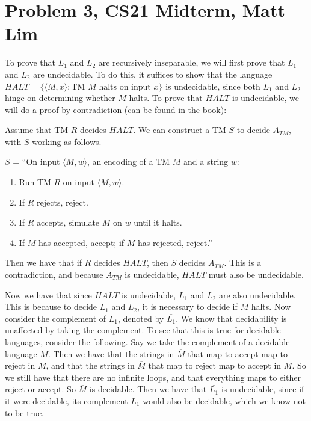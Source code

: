 \documentclass{article}
\begin{document}
\section*{Problem 3, CS21 Midterm, Matt Lim}
To prove that $L_{1}$ and $L_{2}$ are recursively inseparable, we will first
prove that $L_{1}$ and $L_{2}$ are undecidable. To do this, it suffices
to show that the language $HALT = \{\langle M,x \rangle : \text{TM }
M \text{ halts on input } x\}$ is undecidable, since both $L_{1}$ and
$L_{2}$ hinge on determining whether $M$ halts. To prove that $HALT$ is
undecidable, we will do a proof by contradiction (can be found in the
book):

Assume that TM $R$ decides $HALT$. We can construct a TM $S$ to decide
$A_{TM}$, with $S$ working as follows.

\noindent $S$ = ``On input $\langle M,w \rangle$, an encoding of a TM $M$ and
a string
$w$:
    \begin{enumerate}
        \item Run TM $R$ on input $\langle M,w \rangle$.
        \item If $R$ rejects, reject.
        \item If $R$ accepts, simulate $M$ on $w$ until it halts.
        \item If $M$ has accepted, accept; if $M$ has rejected, reject.''
    \end{enumerate}
Then we have that if $R$ decides $HALT$, then $S$ decides $A_{TM}$. This
is a contradiction, and because $A_{TM}$ is undecidable, $HALT$ must also
be undecidable.

Now we have that since $HALT$ is undecidable, $L_{1}$ and $L_{2}$ are also
undecidable. This is because to decide $L_{1}$ and $L_{2}$, it is necessary
to decide if $M$ halts. Now consider the complement of $L_{1}$, denoted by
$\overline{L_{1}}$. We know that decidability is unaffected by taking the
complement. To see that this is true for decidable languages, consider the
following. Say we take the complement of a decidable language $M$. Then we
have that the strings in $\overline{M}$ that map to accept map to reject
in $M$, and that the strings in $\overline{M}$ that map to reject map to
accept in $M$. So we still have that there are no infinite loops, and
that everything maps to either reject or accept.
So $\overline{M}$ is decidable. Then we have that $\overline{L_{1}}$ is
undecidable, since if it were decidable, its complement $L_{1}$ would also
be decidable, which we know not to be true.
\end{document}
